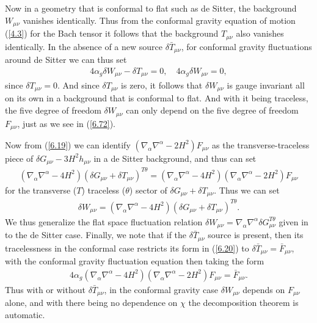 \documentclass[aps,onecolumn,10pt]{revtex4}
\numberwithin{equation}{section}
\numberwithin{equation}{section}
\begin{document}
Now in a geometry that is conformal to flat such as de Sitter, the background $W_{\mu\nu}$ vanishes identically. Thus from the conformal gravity equation of motion (\ref{4.3}) for the Bach tensor it follows that the background $T_{\mu\nu}$ also vanishes identically. In the absence of a new source $\delta \bar{T}_{\mu\nu}$, for conformal gravity fluctuations around de Sitter  we can thus set 
%
\begin{eqnarray}
4\alpha_g\delta W_{\mu\nu}-\delta T_{\mu\nu}=0,\quad 4\alpha_g\delta W_{\mu\nu}=0,
\label{6.73}
\end{eqnarray}
%
since $\delta T_{\mu\nu}=0$. And since $\delta T_{\mu\nu}$ is zero,  it follows that  $\delta W_{\mu\nu}$ is gauge invariant all on its own in a background that is conformal to flat. And with it being traceless, the five degree of freedom $\delta W_{\mu\nu}$ can only depend on the five degree of freedom $F_{\mu\nu}$, just as we see in (\ref{6.72}). 

Now from  (\ref{6.19}) we can identify $(\nabla_{\alpha}\nabla^{\alpha}-2H^2)F_{\mu\nu}$ as the transverse-traceless piece of $\delta G_{\mu\nu}-3H^2h_{\mu\nu}$ in a de Sitter background, and thus can set 
%
\begin{eqnarray}
(\nabla_{\alpha}\nabla^{\alpha}-4H^2)(\delta G_{\mu\nu}+\delta T_{\mu\nu})^{T\theta}=(\nabla_{\alpha}\nabla^{\alpha}-4H^2)(\nabla_{\alpha}\nabla^{\alpha}-2H^2)F_{\mu\nu}
\label{6.74}
\end{eqnarray}
%
for the transverse ($T$) traceless ($\theta$) sector of $\delta G_{\mu\nu}+\delta T_{\mu\nu}$. Thus we can set
%
\begin{eqnarray}
\delta W_{\mu\nu}=(\nabla_{\alpha}\nabla^{\alpha}-4H^2)(\delta G_{\mu\nu}+\delta T_{\mu\nu})^{T\theta}.
\label{6.75}
\end{eqnarray}
%
We thus generalize the flat space fluctuation relation $\delta W_{\mu\nu}=\nabla_{\alpha}\nabla^{\alpha}\delta G_{\mu\nu}^{T\theta}$ given in \cite{footnote6} to the de Sitter case. Finally, we note that if the  $\delta\bar{T}_{\mu\nu}$ source is present, then its tracelessness in the conformal case restricts its form in (\ref{6.20}) to $\delta \bar{T}_{\mu\nu}=\bar{F}_{\mu\nu}$, with the conformal gravity fluctuation equation then taking the form 
%
\begin{eqnarray}
4\alpha_g(\nabla_{\alpha}\nabla^{\alpha}-4H^2)(\nabla_{\alpha}\nabla^{\alpha}-2H^2)F_{\mu\nu}=\bar{F}_{\mu\nu}.
\label{6.76}
\end{eqnarray}
%
Thus with or without $\delta \bar{T}_{\mu\nu}$, in the conformal gravity case $\delta W_{\mu\nu}$ depends on $F_{\mu\nu}$ alone, and with there being no dependence on $\chi$ the decomposition theorem is automatic. 
\end{document}
